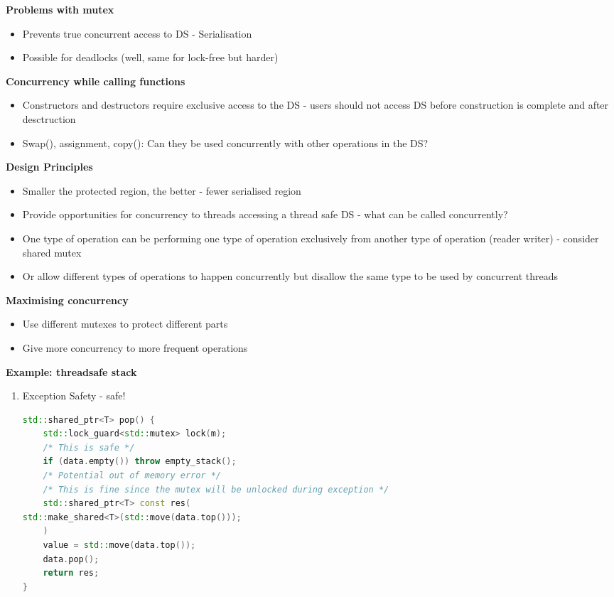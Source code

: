 \documentclass[10pt, landscape]{article}
\begin{document}
\begin{multicols}{4}
\textbf{Problems with mutex} \\
\begin{itemize}
    \item Prevents true concurrent access to DS - Serialisation
    \item Possible for deadlocks (well, same for lock-free but harder)
\end{itemize}

\textbf{Concurrency while calling functions} \\
\begin{itemize}
    \item Constructors and destructors require exclusive access to the DS - users should not access DS before construction is complete and after desctruction
    \item Swap(), assignment, copy(): Can they be used concurrently with other operations in the DS?
\end{itemize}

\textbf{Design Principles} \\
\begin{itemize}
    \item Smaller the protected region, the better - fewer serialised region
    \item Provide opportunities for concurrency to threads accessing a thread safe DS - what can be called concurrently?
    \item One type of operation can be performing one type of operation exclusively from another type of operation (reader writer) - consider shared mutex
    \item Or allow different types of operations to happen concurrently but disallow the same type to be used by concurrent threads
\end{itemize}

\textbf{Maximising concurrency} \\
\begin{itemize}
    \item Use different mutexes to protect different parts 
    \item Give more concurrency to more frequent operations
\end{itemize}


\textbf{Example: threadsafe stack} \\
\begin{enumerate}
    \item Exception Safety - safe!
    \begin{lstlisting}[language=C++, breaklines=true, breakatwhitespace=true]
std::shared_ptr<T> pop() {
    std::lock_guard<std::mutex> lock(m);
    /* This is safe */
    if (data.empty()) throw empty_stack();
    /* Potential out of memory error */
    /* This is fine since the mutex will be unlocked during exception */
    std::shared_ptr<T> const res(
std::make_shared<T>(std::move(data.top()));
    )
    value = std::move(data.top());
    data.pop(); 
    return res;
}
\end{lstlisting}


\end{enumerate}
\end{multicols}
\end{document}
